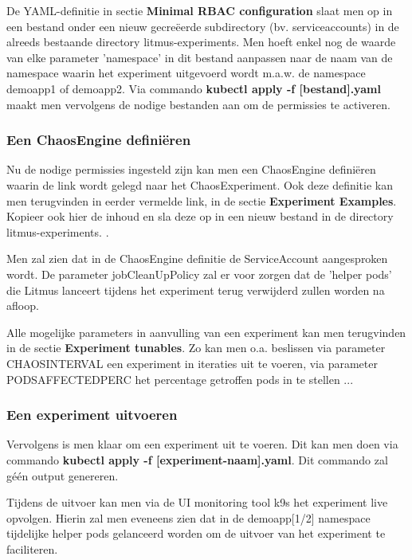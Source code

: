 De YAML-definitie in sectie {\bf Minimal RBAC configuration} slaat men op in een bestand onder een nieuw gecreëerde subdirectory (bv. serviceaccounts) in de alreeds bestaande directory litmus-experiments. Men hoeft enkel nog de waarde van elke parameter 'namespace' in dit bestand aanpassen naar de naam van de namespace waarin het experiment uitgevoerd wordt m.a.w. de namespace demoapp1 of demoapp2. \newline Via commando {\bf kubectl apply -f [bestand].yaml} maakt men vervolgens de nodige bestanden aan om de permissies te activeren.  

\subsubsection{Een ChaosEngine definiëren}

Nu de nodige permissies ingesteld zijn kan men een ChaosEngine definiëren waarin de link wordt gelegd naar het ChaosExperiment. Ook deze definitie kan men terugvinden in eerder vermelde link, in de sectie {\bf Experiment Examples}. Kopieer ook hier de inhoud en sla deze op in een nieuw bestand in de directory litmus-experiments. \autocite{Experiments2022}. 

Men zal zien dat in de ChaosEngine definitie de ServiceAccount aangesproken wordt. De parameter jobCleanUpPolicy zal er voor zorgen dat de 'helper pods' die Litmus lanceert tijdens het experiment terug verwijderd zullen worden na afloop.

Alle mogelijke parameters in aanvulling van een experiment kan men terugvinden in de sectie {\bf Experiment tunables}. Zo kan men o.a. beslissen via parameter CHAOS\textunderscore INTERVAL een experiment in iteraties uit te voeren, via parameter PODS\textunderscore AFFECTED\textunderscore PERC het percentage getroffen pods in te stellen ... 

\subsubsection{Een experiment uitvoeren}
\label{subsec:experimentuitvoeren}
Vervolgens is men klaar om een experiment uit te voeren. Dit kan men doen via commando {\bf kubectl apply -f [experiment-naam].yaml}. Dit commando zal géén output genereren. 

Tijdens de uitvoer kan men via de UI monitoring tool k9s het experiment live opvolgen. Hierin zal men eveneens zien dat in de demoapp[1/2] namespace tijdelijke helper pods gelanceerd worden om de uitvoer van het experiment te faciliteren. 

